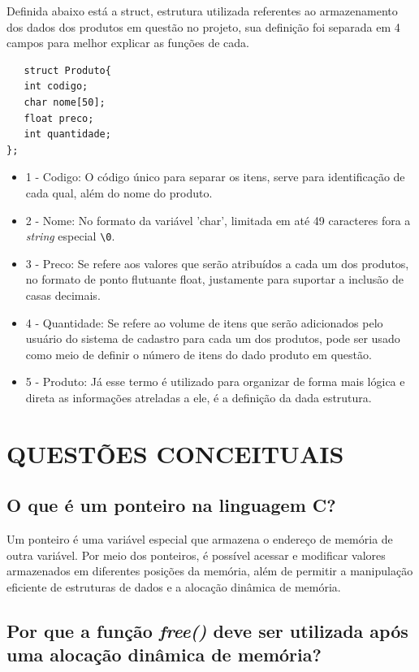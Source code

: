 \documentclass[12pt, a4paper, brazil]{article}
\begin{document}
Definida abaixo está a struct, estrutura utilizada referentes ao armazenamento dos dados dos produtos em questão no projeto, sua definição foi separada em 4 campos para melhor explicar as funções de cada.
\vspace{0.3cm}
\begin{verbatim}
   struct Produto{
   int codigo;
   char nome[50];
   float preco;
   int quantidade;
};

\end{verbatim}
\begin{itemize}
    \item 1 - Codigo: O código único para separar os itens, serve para identificação de cada qual, além do nome do produto. 
    \item 2 - Nome: No formato da variável 'char', limitada em até 49 caracteres fora a \textit{string} especial \verb|\0|.
    \item 3 - Preco: Se refere aos valores que serão atribuídos a cada um dos produtos, no formato de ponto flutuante float, justamente para suportar a inclusão de casas decimais.
    \item 4 - Quantidade: Se refere ao volume de itens que serão adicionados pelo usuário do sistema de cadastro para cada um dos produtos, pode ser usado como meio de definir o número de itens do dado produto em questão.
    \item 5 - Produto: Já esse termo é utilizado para organizar de forma mais lógica e direta as informações atreladas a ele, é a definição da dada estrutura.
\end{itemize}

\section{QUESTÕES CONCEITUAIS}

\subsection{O que é um ponteiro na linguagem C?}

Um ponteiro é uma variável especial que armazena o endereço de memória de outra variável. Por meio dos ponteiros, é possível acessar e modificar valores armazenados em diferentes posições da memória, além de permitir a manipulação eficiente de estruturas de dados e a alocação dinâmica de memória.

\subsection{Por que a função \textit{free()} deve ser utilizada após uma alocação dinâmica de memória?}
\end{document}
